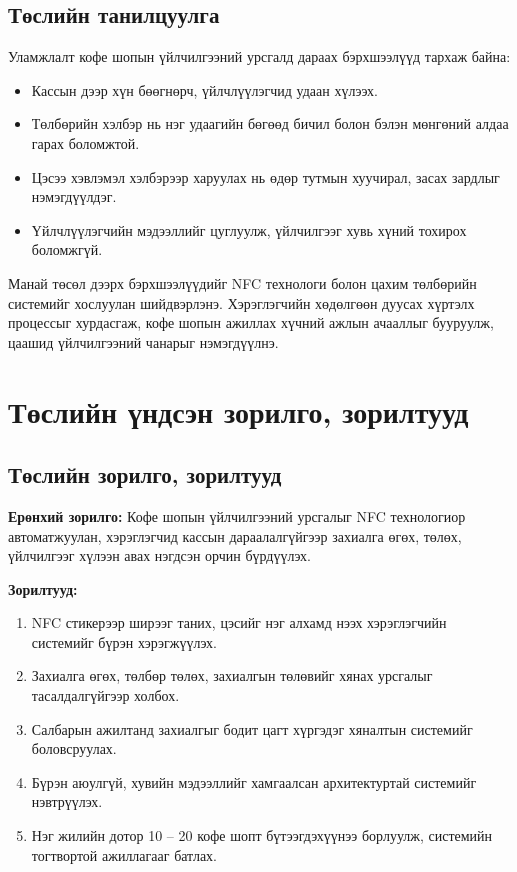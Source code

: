 \subsection{Төслийн танилцуулга}

Уламжлалт кофе шопын үйлчилгээний урсгалд дараах бэрхшээлүүд
тархаж байна:

\begin{itemize}
  \item Кассын дээр хүн бөөгнөрч, үйлчлүүлэгчид удаан хүлээх.
  \item Төлбөрийн хэлбэр нь нэг удаагийн бөгөөд бичил болон бэлэн
        мөнгөний алдаа гарах боломжтой.
  \item Цэсээ хэвлэмэл хэлбэрээр харуулах нь өдөр тутмын хуучирал,
        засах зардлыг нэмэгдүүлдэг.
  \item Үйлчлүүлэгчийн мэдээллийг цуглуулж, үйлчилгээг хувь хүний
        тохирох боломжгүй.
\end{itemize}

Манай төсөл дээрх бэрхшээлүүдийг NFC технологи болон цахим төлбөрийн
системийг хослуулан шийдвэрлэнэ. Хэрэглэгчийн хөдөлгөөн дуусах хүртэлх
процессыг хурдасгаж, кофе шопын ажиллах хүчний ажлын ачааллыг бууруулж,
цаашид үйлчилгээний чанарыг нэмэгдүүлнэ.

\section{Төслийн үндсэн зорилго, зорилтууд}

\subsection{Төслийн зорилго, зорилтууд}

\textbf{Ерөнхий зорилго:} Кофе шопын үйлчилгээний урсгалыг NFC
технологиор автоматжуулан, хэрэглэгчид кассын дараалалгүйгээр захиалга
өгөх, төлөх, үйлчилгээг хүлээн авах нэгдсэн орчин бүрдүүлэх.

\textbf{Зорилтууд:}

\begin{enumerate}
  \item NFC стикерээр ширээг таних, цэсийг нэг алхамд нээх хэрэглэгчийн
        системийг бүрэн хэрэгжүүлэх.
  \item Захиалга өгөх, төлбөр төлөх, захиалгын төлөвийг хянах урсгалыг
        тасалдалгүйгээр холбох.
  \item Салбарын ажилтанд захиалгыг бодит цагт хүргэдэг хяналтын
        системийг боловсруулах.
  \item Бүрэн аюулгүй, хувийн мэдээллийг хамгаалсан архитектуртай
        системийг нэвтрүүлэх.
  \item Нэг жилийн дотор 10 -- 20 кофе шопт бүтээгдэхүүнээ
        борлуулж, системийн тогтвортой ажиллагааг батлах.
\end{enumerate}

